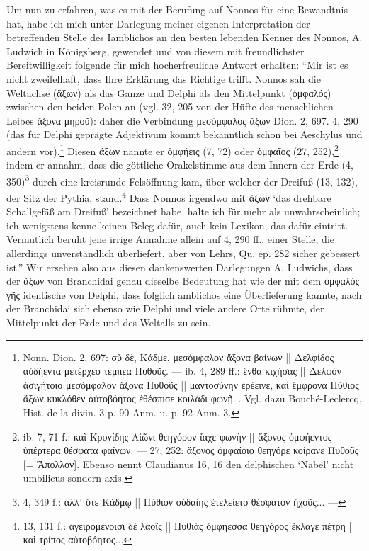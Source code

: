 \documentclass[a4paper, 11pt, oneside]{article}
\begin{document}
Um nun zu erfahren, was es mit der Berufung auf Nonnos für eine Bewandtnis hat, habe ich mich unter Darlegung meiner eigenen Interpretation der betreffenden Stelle des Iamblichos an den besten lebenden Kenner des Nonnos, A. Ludwich in Königsberg, gewendet und von diesem mit freundlichster Bereitwilligkeit folgende für mich hocherfreuliche Antwort erhalten: "`Mir ist es nicht zweifelhaft, dass Ihre Erklärung das Richtige trifft. Nonnos sah die Weltachse (ἄξων) als das Ganze und Delphi als den Mittelpunkt (ὀμφαλός) zwischen den beiden Polen an (vgl. 32, 205 von der Hüfte des menschlichen Leibes ἄξονα μηροῦ): daher die Verbindung μεσόμφαλος ἄξων Dion. 2, 697. 4, 290 (das für Delphi geprägte Adjektivum kommt bekanntlich schon bei Aeschylus und andern vor).\footnote{Nonn. Dion. 2, 697: σὺ δὲ, Κάδμε, μεσόμφαλον ἄξονα βαίνων || Δελφίδος αὐδήεντα μετέρχεο τέμπεα Πυθοῦς. --- ib. 4, 289 ff.: ἔνθα κιχήσας || Δελφὸν ἀσιγήτοιο μεσόμφαλον ἄξονα Πυθοῦς || μαντοσύνην ἐρέεινε, καὶ ἔμφρονα Πύθιος ἄξων κυκλόθεν αὐτοβόητος ἐθέσπισε κοιλάδι φωνῇ... Vgl. dazu Bouché-Leclercq, Hist. de la divin. 3 p. 90 Anm. u. p. 92 Anm. 3.} Diesen ἄξων nannte er ὀμφήεις (7, 72) oder ὀμφαῖος (27, 252),\footnote{ib. 7, 71 f.: καὶ Κρονίδης Αἰῶνι θεηγόρον ἴαχε φωνὴν || ἄξονος ὀμφήεντος ὑπέρτερα θέσφατα φαίνων. --- 27, 252: ἄξονος ὀμφαίοιο θεηγόρε κοίρανε Πυθοῦς [= Ἄπολλον]. Ebenso nennt Claudianus 16, 16 den delphischen `Nabel' nicht umbilicus sondern axis.} indem er annahm, dass die göttliche Orakelstimme aus dem Innern der Erde (4, 350)\footnote{4, 349 f.: ἀλλ᾽ ὅτε Κάδμῳ || Πύθιον οὐδαίης ἐτελείετο θέσφατον ἠχοῦς... ---} durch eine kreisrunde Felsöffnung kam, über welcher der Dreifuß (13, 132), der Sitz der Pythia, stand.\footnote{13, 131 f.: ἀγειρομένοισι δὲ λαοῖς || Πυθιὰς ὀμφήεσσα θεηγόρος ἔκλαγε πέτρη || καὶ τρίπος αὐτοβόητος...} Dass Nonnos irgendwo mit ἄξων `das drehbare Schallgefäß am Dreifuß' bezeichnet habe, halte ich für mehr als unwahrscheinlich; ich wenigstens kenne keinen Beleg dafür, auch kein Lexikon, das dafür eintritt. Vermutlich beruht jene irrige Annahme allein auf 4, 290 ff., einer Stelle, die allerdings unverständlich überliefert, aber von Lehrs, Qu. ep. 282 sicher gebessert ist."' Wir ersehen also aus diesen dankenswerten Darlegungen A. Ludwichs, dass der ἄξων von Branchidai genau dieselbe Bedeutung hat wie der mit dem ὀμφαλὸς γῆς identische von Delphi, dass folglich amblichos eine Überlieferung kannte, nach der Branchidai sich ebenso wie Delphi und viele andere Orte rühmte, der Mittelpunkt der Erde und des Weltalls zu sein.
\end{document}
